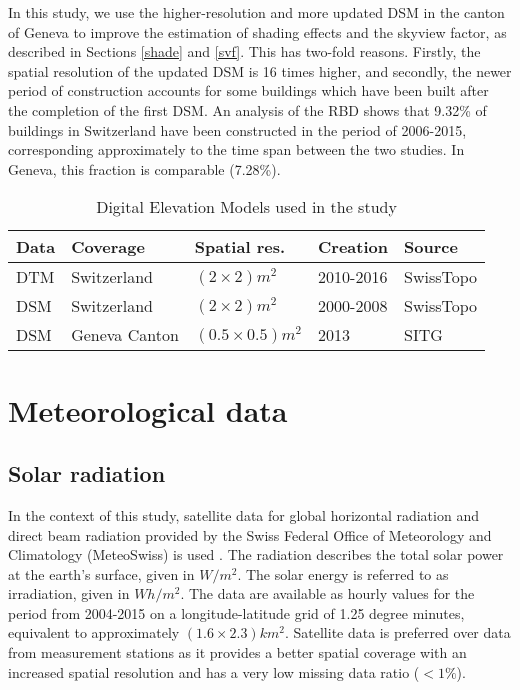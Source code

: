 In this study, we use the higher-resolution and more updated DSM in the canton of Geneva to improve the estimation of shading effects and the skyview factor, as described in Sections \ref{shade} and \ref{svf}. This has two-fold reasons. Firstly, the spatial resolution of the updated DSM is 16 times higher, and secondly, the newer period of construction accounts for some buildings which have been built after the completion of the first DSM. An analysis of the RBD shows that 9.32\% of buildings in Switzerland have been constructed in the period of 2006-2015, corresponding approximately to the time span between the two studies. In Geneva, this fraction is comparable (7.28\%).


\begin{table}[b]
\centering
\footnotesize
\begin{tabular} {lllll} %
\hline
\textbf{Data} & \textbf{Coverage} & \textbf{Spatial res.} & \textbf{Creation} & \textbf{Source}\\
\hline 
DTM  & Switzerland & $(2\times2) m^2$ & 2010-2016 & SwissTopo \cite{swisstopo_swissalti3d_2017} \\
DSM  & Switzerland & $(2\times2) m^2$ & 2000-2008 & SwissTopo \cite{swisstopo_dsm_2005} \\
DSM  & Geneva Canton & $(0.5\times0.5) m^2$ & 2013 & SITG \cite{sitg_mns_2018} \\
\hline
\end{tabular}
\caption{Digital Elevation Models used in the study}
\label{tab:surface}
\end{table}

\section{Meteorological data}

\subsection{Solar radiation}
In the context of this study, satellite data for global horizontal radiation and direct beam radiation provided by the Swiss Federal Office of Meteorology and Climatology (MeteoSwiss) is used \cite{stockli_heliomont_2017}. The radiation describes the total solar power at the earth's surface, given in $W/m^2$. The solar energy is referred to as irradiation, given in $Wh/m^2$. The data are available as hourly values for the period from 2004-2015 on a longitude-latitude grid of 1.25 degree minutes, equivalent to approximately $(1.6 \times 2.3)km^2$. Satellite data is preferred over data from measurement stations as it provides a better spatial coverage with an increased spatial resolution and has a very low missing data ratio ($<1\%$).


